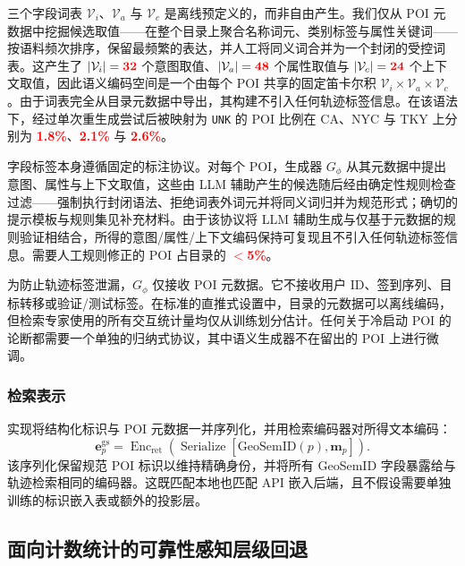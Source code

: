 \documentclass[10pt,fontset=none,twocolumn]{ctexart}
\newcommand{\gsid}{\mathrm{GeoSemID}}
\newcommand{\mock}[1]{\textbf{\textcolor{red}{#1}}}
\begin{document}
三个字段词表 $\mathcal{V}_{i}$、$\mathcal{V}_{a}$ 与 $\mathcal{V}_{c}$ 是离线预定义的，而非自由产生。我们仅从 POI 元数据中挖掘候选取值——在整个目录上聚合名称词元、类别标签与属性关键词——按语料频次排序，保留最频繁的表达，并人工将同义词合并为一个封闭的受控词表。这产生了 $|\mathcal{V}_{i}|=\mock{32}$ 个意图取值、$|\mathcal{V}_{a}|=\mock{48}$
个属性取值与 $|\mathcal{V}_{c}|=\mock{24}$ 个上下文取值，因此语义编码空间是一个由每个 POI 共享的固定笛卡尔积 $\mathcal{V}_{i}\times\mathcal{V}_{a}\times\mathcal{V}_{c}$。由于词表完全从目录元数据中导出，其构建不引入任何轨迹标签信息。在该语法下，经过单次重生成尝试后被映射为 \texttt{UNK} 的 POI 比例在 CA、NYC 与 TKY 上分别为 \mock{1.8\%}、\mock{2.1\%} 与 \mock{2.6\%}。

字段标签本身遵循固定的标注协议。对每个 POI，生成器 $G_{\phi}$ 从其元数据中提出意图、属性与上下文取值，这些由 LLM 辅助产生的候选随后经由确定性规则检查过滤——强制执行封闭语法、拒绝词表外词元并将同义词归并为规范形式；确切的提示模板与规则集见补充材料。由于该协议将 LLM 辅助生成与仅基于元数据的规则验证相结合，所得的意图/属性/上下文编码保持可复现且不引入任何轨迹标签信息。需要人工规则修正的 POI 占目录的 \mock{$<$5\%}。

为防止轨迹标签泄漏，$G_{\phi}$ 仅接收 POI 元数据。它不接收用户 ID、签到序列、目标转移或验证/测试标签。在标准的直推式设置中，目录的元数据可以离线编码，但检索专家使用的所有交互统计量均仅从训练划分估计。任何关于冷启动 POI 的论断都需要一个单独的归纳式协议，其中语义生成器不在留出的 POI 上进行微调。

\subsubsection{检索表示}

实现将结构化标识与 POI 元数据一并序列化，并用检索编码器对所得文本编码：
\begin{equation}
\bm{e}_{p}^{\mathrm{gs}}
=
\operatorname{Enc}_{\mathrm{ret}}
\left(
\operatorname{Serialize}
\left[
\gsid(p),\bm{m}_p
\right]
\right).
\label{eq:geosemid_embedding}
\end{equation}
该序列化保留规范 POI 标识以维持精确身份，并将所有 GeoSemID 字段暴露给与轨迹检索相同的编码器。这既匹配本地也匹配 API 嵌入后端，且不假设需要单独训练的标识嵌入表或额外的投影层。

\subsection{面向计数统计的可靠性感知层级回退}
\label{subsec:backoff}
\end{document}
